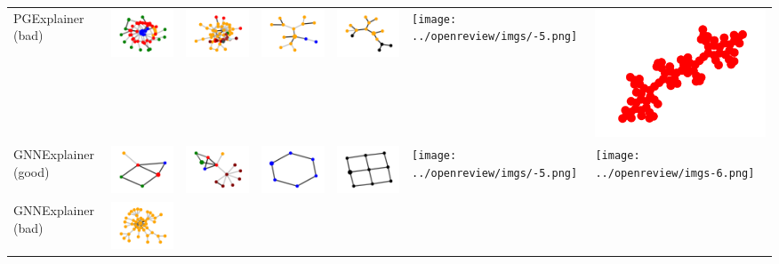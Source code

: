 \begin{table}[]
\begin{tabular}{lllllll}
PGExplainer (bad) &  \includegraphics[width=.1\linewidth]{../openreview/imgs/extension/pg/syn1_bad.png}
& \includegraphics[width=.1\linewidth]{imgs/extension/pg/syn2_bad.png} & \includegraphics[width=.1\linewidth]{../openreview/imgs/extension/pg/syn3_bad.png} & \multicolumn{1}{l|}{\includegraphics[width=.1\linewidth]{../openreview/imgs/extension/pg/syn4_bad.png}} & \texttt{[image: ../openreview/imgs/-5.png]} & \includegraphics[width=.1\linewidth]{../openreview/imgs/extension/gnn/mutag_bad.png} \\
GNNExplainer (good) &  \includegraphics[width=.1\linewidth]{../openreview/imgs/extension/pg/syn1_good.png}
& \includegraphics[width=.1\linewidth]{../openreview/imgs/extension/pg/syn2_good.png} & \includegraphics[width=.1\linewidth]{../openreview/imgs/extension/pg/syn3_good.png} & \multicolumn{1}{l|}{\includegraphics[width=.1\linewidth]{../openreview/imgs/extension/pg/syn4_good.png}} & \texttt{[image: ../openreview/imgs/-5.png]} & \texttt{[image: ../openreview/imgs-6.png]} \\
GNNExplainer (bad) &  \includegraphics[width=.1\linewidth]{../openreview/imgs/extension/gnn/syn1_bad.png}

\end{tabular}
\end{table}
